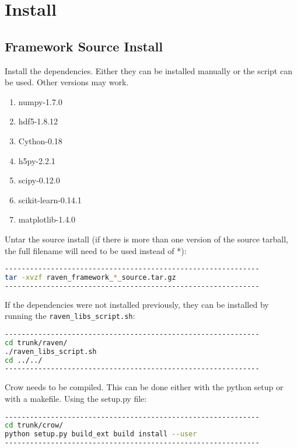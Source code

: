 \section{Install}

\subsection{Framework Source Install}

Install the dependencies.  Either they can be installed manually or the script can be used.  Other versions may work.

\begin{enumerate}
\item numpy-1.7.0
\item hdf5-1.8.12
\item Cython-0.18
\item h5py-2.2.1
\item scipy-0.12.0
\item scikit-learn-0.14.1
\item matplotlib-1.4.0
\end{enumerate}

Untar the source install (if there is more than one version of the
source tarball, the full filename will need to be used instead of *):

\begin{lstlisting}[language=bash]
-------------------------------------------------------------
tar -xvzf raven_framework_*_source.tar.gz
-------------------------------------------------------------
\end{lstlisting}

If the dependencies were not installed previously, they can be installed by
running the \verb'raven_libs_script.sh':

\begin{lstlisting}[language=bash]
-------------------------------------------------------------
cd trunk/raven/
./raven_libs_script.sh
cd ../../
-------------------------------------------------------------
\end{lstlisting}

Crow needs to be compiled.  This can be done either with the python
setup or with a makefile.  Using the setup.py file:

\begin{lstlisting}[language=bash]
-------------------------------------------------------------
cd trunk/crow/
python setup.py build_ext build install --user
-------------------------------------------------------------
\end{lstlisting}

